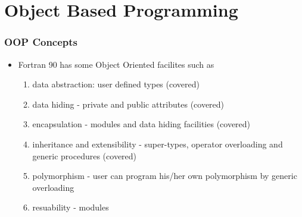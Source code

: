\documentclass[10pt,t]{beamer}
\begin{document}
\section{Object Based Programming}
\begin{frame}
  \frametitle{\small OOP Concepts}
  \begin{itemize}
    \item Fortran 90 has some Object Oriented facilites such as
    \begin{enumerate}
      \item data abstraction: user defined types (covered)
      \item data hiding - private and public attributes (covered)
      \item encapsulation - modules and data hiding facilities (covered)
      \item inheritance and extensibility - super-types, operator overloading and generic procedures (covered)
      \item polymorphism - user can program his/her own polymorphism by generic overloading
      \item resuability - modules
    \end{enumerate}
  \end{itemize}
\end{frame}
\end{document}
